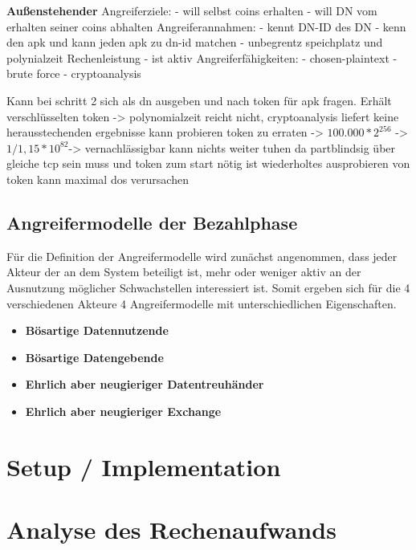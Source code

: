 \documentclass[11pt,a4paper]{scrreprt}
\begin{document}
\textbf{Außenstehender}
Angreiferziele:
    - will selbst coins erhalten
    - will DN vom erhalten seiner coins abhalten
Angreiferannahmen:
    - kennt DN-ID des DN
    - kenn den apk und kann jeden apk zu dn-id matchen
    - unbegrentz speichplatz und polynialzeit Rechenleistung
    - ist aktiv
Angreiferfähigkeiten:
    - chosen-plaintext
    - brute force
    - cryptoanalysis

Kann bei schritt 2 sich als dn ausgeben und nach token für apk fragen.
Erhält verschlüsselten token -> polynomialzeit reicht nicht, cryptoanalysis liefert keine herausstechenden ergebnisse
kann probieren token zu erraten -> $100.000 * 2^256$ -> $1/1,15*10^82 $-> vernachlässigbar
kann nichts weiter tuhen da partblindsig über gleiche tcp sein muss und token zum start nötig ist
wiederholtes ausprobieren von token kann maximal dos verursachen


\subsection{Angreifermodelle der Bezahlphase}
Für die Definition der Angreifermodelle wird zunächst angenommen, dass jeder Akteur der an dem System beteiligt ist, mehr oder weniger aktiv an der Ausnutzung möglicher Schwachstellen interessiert ist. Somit ergeben sich für die 4 verschiedenen Akteure 4 Angreifermodelle mit unterschiedlichen Eigenschaften.
\begin{itemize}
    \item \textbf{Bösartige Datennutzende}
    \item \textbf{Bösartige Datengebende}
    \item \textbf{Ehrlich aber neugieriger Datentreuhänder}
    \item \textbf{Ehrlich aber neugieriger Exchange}
\end{itemize}


\section{Setup / Implementation}

\section{Analyse des Rechenaufwands}
\end{document}
